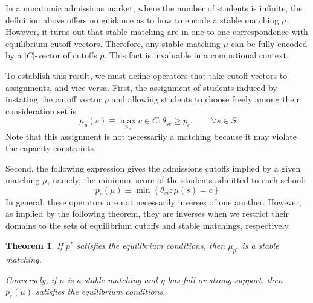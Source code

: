 \documentclass[12pt]{article}
\newtheorem{theorem}{Theorem}
\theoremstyle{definition}
\begin{document}
In a nonatomic admissions market, where the number of students is infinite, the definition above offers no guidance as to how to encode a stable matching $\mu$. However, it turns out that stable matching are in one-to-one correspondence with equilibrium cutoff vectors. Therefore, any stable matching $\mu$ can be fully encoded by a $|C|$-vector of cutoffs $p$. This fact is invaluable in a computional context.

To establish this result, we must define operators that take cutoff vectors to assignments, and vice-versa. First, the assignment of students induced by instating the cutoff vector $p$ and allowing students to choose freely among their consideration set is
\[\mu_p(s) \equiv \max_{>_s} c \in C : \theta_{sc} \geq p_c, \qquad \forall s \in S\]  %
Note that this assignment is not necessarily a matching because it may violate the capacity constraints. 

Second, the following expression gives the admissions cutoffs implied by a given matching $\mu$, namely, the minimum score of the students admitted to each school:
\[p_c(\mu) \equiv \min \left\{\theta_{sc}: \mu(s) = c\right\}\]
In general, these operators are not necessarily inverses of one another. However, as implied by the following theorem, they are inverses when we restrict their domains to the sets of equilibrium cutoffs and stable matchings, respectively. 

\begin{theorem}If $p^*$ satisfies the equilibrium conditions, then $\mu_{p^*}$ is a stable matching. 

Conversely, if $\bar \mu$ is a stable matching and $\eta$ has full or strong support, then $p_c(\bar \mu)$ satisfies the equilibrium conditions. \end{theorem}
\end{document}

